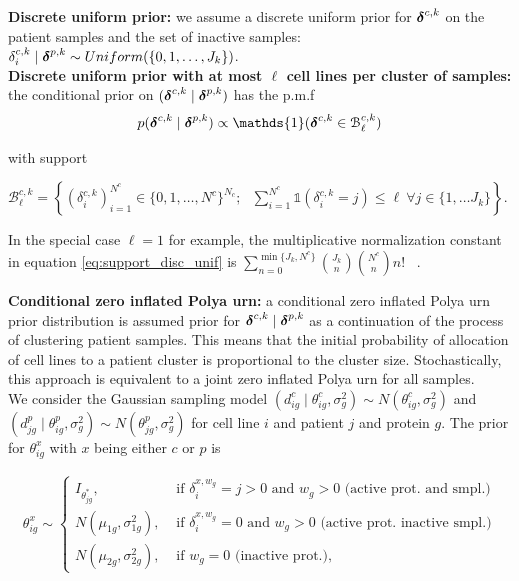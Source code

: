 \noindent \textbf{Discrete uniform prior:} we assume a discrete uniform prior for $\mbox{\boldmath $\delta$}^{c,k}$ on the patient samples and the set of inactive samples: $\delta^{c,k}_i \mid \mbox{\boldmath $\delta$}^{p,k} \sim Uniform( \{0, 1,\ldots, J_k\})$.\\

\noindent \textbf{Discrete uniform prior with at most $\ell$ cell lines per cluster of samples:} the conditional prior on $(\mbox{\boldmath $\delta$}^{c,k} \mid \mbox{\boldmath $\delta$}^{p,k})$ has the  p.m.f 
\begin{equation}
p(\bfdelta^{c,k} \mid \bfdelta^{p,k}) \propto \mathds{1}(\bfdelta^{c,k} \in \mathcal{B}^{c,k}_{\ell})
\label{eq:support_disc_unif}
\end{equation}

\noindent with support 

\hspace{-1 cm}$\mathcal{B}^{c,k}_{\ell}=\left\{(\delta^{c,k}_i)^{N^c}_{i=1} \in \{0, 1, \ldots, N^c\}^{N_c}; \ \ \ \sum^{N^c}_{i = 1} \mathds{1}(\delta^{c,k}_i = j)\leq \ell \ \forall j \in \{1, \ldots J_k\} \right\}.$

\noindent In the special case $\ell = 1$ for example, the multiplicative normalization constant in equation \eqref{eq:support_disc_unif} is $\sum^{ \min\{J_k, N^c\} }_{n=0} {J_k \choose n} {{N^c}\choose n} n!$ \ .


\noindent \textbf{Conditional zero inflated Polya urn:} a conditional zero inflated Polya urn prior distribution is assumed prior for $\mbox{\boldmath $\delta$}^{c,k} \mid \mbox{\boldmath $\delta$}^{p,k}$ as a continuation of the process of clustering patient samples. This means that the initial probability of allocation of cell lines to a patient cluster is proportional to the cluster size. Stochastically, this approach is equivalent to a joint zero inflated Polya urn for all samples.\\


We consider the Gaussian sampling model $(d^c_{ig}\mid\theta^c_{ig},\sigma^2_g) \sim N(\theta^c_{ig}, \sigma^2_g)$ and $(d^p_{jg}\mid\theta^p_{ig},\sigma^2_g)  \sim N(\theta^p_{jg}, \sigma^2_g)$ for cell line $i$ and patient $j$ and protein $g$. The prior for $\theta^x_{ig}$ with $x$ being either $c$ or $p$ is

\begin{align}
\theta^x_{ig}\sim
\begin{cases}
I_{\theta^*_{jg}}, \ &\mbox{ if  } \delta^{x, w_g}_i = j > 0 \mbox{ and } w_g > 0 \mbox{ (active prot. and smpl.)}\\
N(\mu_{1g}, \sigma^2_{1g}), &\mbox{ if  } \delta^{x,w_g}_i = 0 \mbox{ and }w_g>0 \mbox{ (active prot. inactive smpl.)} \\
N(\mu_{2g}, \sigma^2_{2g}), &\mbox{ if  } w_g=0 \mbox{ (inactive prot.)},
\end{cases}
\label{eq:unique_mean}
\end{align}

